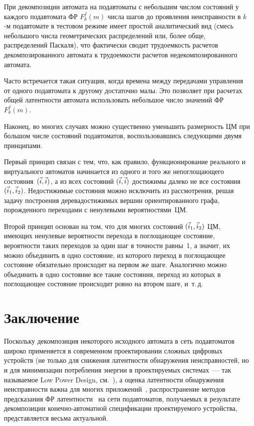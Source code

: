 \begin{multicols}{2}
При декомпозиции автомата на подавтоматы с небольшим числом состояний
у каждого подавтомата ФР $F^f_k(m)$ числа шагов до проявления
неисправности в $k$-м подавтомате в тестовом режиме имеет простой
аналитический вид (смесь небольшого числа геометрических
распределений или, более обще, распределений Паскаля), что
фактически сводит трудоемкость расчетов декомпозированного автомата
к трудоемкости расчетов недекомпозированного автомата.

Часто встречается такая ситуация, когда времена между передачами
управления от одного подавтомата к другому достаточно малы.
Это позволяет при расчетах общей латентности автомата использовать
небольшое число значений ФР~$F^f_k(m)$.

Наконец, во многих случаях можно существенно уменьшить размерность ЦМ
при большом числе состояний подавтоматов, воспользовавшись следующими
двумя принципами.

 Первый принцип связан с тем, что, как правило, функционирование
реального и виртуального автоматов начинается из одного и того же
непоглощающего со\-сто\-яния~$(\vec i,\vec i)$, а из всех состояний $(\vec i,\vec i)$
достижимы далеко не все со\-сто\-яния~$(\vec i_1,\vec i_2)$.
Не\-достижимые состояния можно исключить из рас\-смотре\-ния, решая задачу
построения дерева\linebreak достижимых вершин ориентированного графа, порожденного
переходами с ненулевыми ве\-ро\-ят\-ностя\-ми~ЦМ.

 Второй принцип основан на том, что для многих состояний $(\vec i_1,\vec i_2)$
ЦМ, имеющих ненулевые вероятности перехода в поглощающее состояние, вероятности
таких переходов за один шаг в точности равны~1, а значит, их можно объединить
в одно состояние, из которого переход в поглощающее состояние обязательно
происходит на первом же шаге.
Аналогично можно объединить в одно состояние все такие состояния, переход из
которых в поглощающее состояние происходит ровно на втором шаге, и~т.\,д.

\vspace*{-6pt}

\section{Заключение}
\vspace*{-3pt}

 Поскольку декомпозиция некоторого исходного автомата в сеть подавтоматов
широко применяется в современном проектировании сложных цифровых устройств
(не только для снижения латентности обнаружения неисправностей, но и для
минимизации потребления энергии в проек\-ти\-ру\-емых системах~--- так называемое
Low Power Design, см.~\cite{11}), а оценка латентности обнаружения неисправности
важна для многих приложений~\cite{13, 12},\linebreak
распространение методов предсказания
ФР латентности~\cite{4} на сети подавтоматов, получаемых
в результате декомпозиции конечно-автоматной\linebreak
 спецификации проектируемого
устройства, пред\-став\-ля\-ет\-ся весьма актуальной.


\end{multicols}
